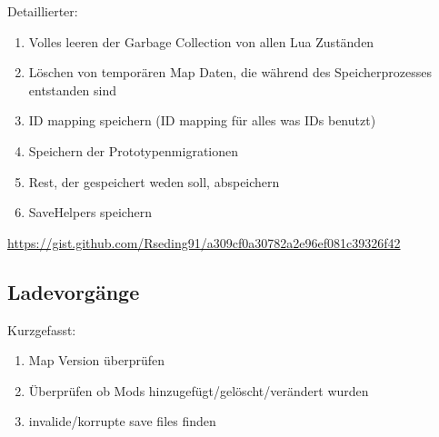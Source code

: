 Detaillierter:
\begin{enumerate}
    \item Volles leeren der Garbage Collection von allen Lua Zuständen
    \item Löschen von temporären Map Daten, die während des Speicherprozesses entstanden sind
    \item ID mapping speichern (ID mapping für alles was IDs benutzt)
    \item Speichern der Prototypenmigrationen
    \item Rest, der gespeichert weden soll, abspeichern
    \item SaveHelpers speichern
\end{enumerate}
\url{https://gist.github.com/Rseding91/a309cf0a30782a2e96ef081c39326f42} 

\subsection{Ladevorgänge}
Kurzgefasst:
\begin{enumerate}
    \item Map Version überprüfen
    \item Überprüfen ob Mods hinzugefügt/gelöscht/verändert wurden
    \item invalide/korrupte save files finden 
\end{enumerate}

